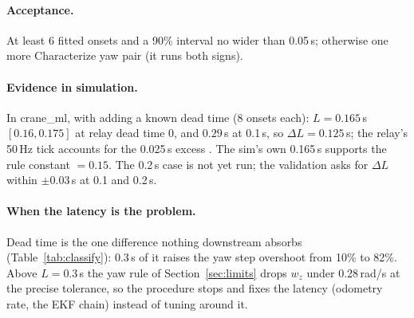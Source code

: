\paragraph{Acceptance.} At least 6 fitted onsets and a 90\% interval no wider than 0.05\,s;
otherwise one more Characterize yaw pair (it runs both signs).

\paragraph{Evidence in simulation.} In crane\_ml, with  adding a known dead
time (8 onsets each): $L = 0.165$\,s $[0.16, 0.175]$ at relay dead time 0, and $0.29$\,s at 0.1\,s,
so $\Delta L = 0.125$\,s; the relay's 50\,Hz tick accounts for the 0.025\,s excess
. The sim's own 0.165\,s supports the rule constant
 $= 0.15$. The 0.2\,s case is not yet run; the validation asks for
$\Delta L$ within $\pm0.03$\,s at 0.1 and 0.2\,s.

\paragraph{When the latency is the problem.} Dead time is the one difference nothing downstream
absorbs (Table~\ref{tab:classify}): 0.3\,s of it raises the yaw step overshoot from 10\% to 82\%. Above
$L = 0.3$\,s the yaw rule of Section~\ref{sec:limits} drops $w_z$ under 0.28\,rad/s at the precise
tolerance, so the procedure stops and fixes the latency (odometry rate, the EKF chain) instead
of tuning around it.


